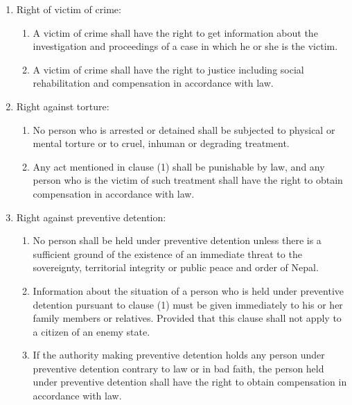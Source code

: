 \begin{questions}
\begin{solution}
\begin{enumerate}
\item Right of victim of crime:
\begin{enumerate}
    \item A victim of crime shall have the right to get information about the investigation and proceedings of a case in which he or she is the victim.
    \item A victim of crime shall have the right to justice including social rehabilitation and compensation in accordance with law.
\end{enumerate}

\item Right against torture:
\begin{enumerate}
    \item No person who is arrested or detained shall be subjected to physical or mental torture or to cruel, inhuman or degrading treatment.
    \item Any act mentioned in clause (1) shall be punishable by law, and any person who is the victim of such treatment shall have the right to obtain compensation in accordance with law.
\end{enumerate}

\item Right against preventive detention:
\begin{enumerate}
    \item No person shall be held under preventive detention unless there is a sufficient ground of the existence of an immediate threat to the sovereignty, territorial integrity or public peace and order of Nepal.
    \item Information about the situation of a person who is held under preventive detention pursuant to clause (1) must be given immediately to his or her family members or relatives. Provided that this clause shall not apply to a citizen of an enemy state.
    \item If the authority making preventive detention holds any person under preventive detention contrary to law or in bad faith, the person held under preventive detention shall have the right to obtain compensation in accordance with law.
\end{enumerate}


\end{enumerate}
\end{solution}
\end{questions}
